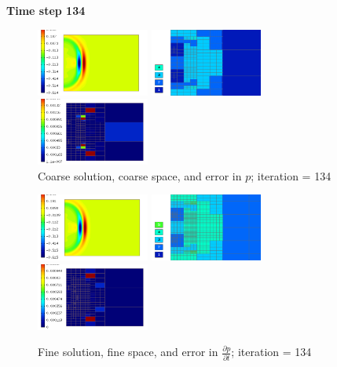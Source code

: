 \textbf{Time step 134}
\begin{figure}[H]
		\includegraphics[width=0.33\textwidth]{img/acoustics/Solution_134.png}\hspace{1mm}
		\includegraphics[width=0.33\textwidth]{img/acoustics/Space_134.png}\hspace{1mm}
		\includegraphics[width=0.33\textwidth]{img/acoustics/ErrorValue_134.png}\\
		\caption{Coarse solution, coarse space, and error in $p$; iteration = 134}
\vspace{5mm}
		\includegraphics[width=0.33\textwidth]{img/acoustics/RefSolution_134.png}\hspace{1mm}
		\includegraphics[width=0.33\textwidth]{img/acoustics/RefSpace_134.png}\hspace{1mm}
		\includegraphics[width=0.33\textwidth]{img/acoustics/ErrorDerivative_134.png}\\
		\caption{Fine solution, fine space, and error in $\frac{\partial p}{\partial t}$; iteration = 134}
	\end{figure}

